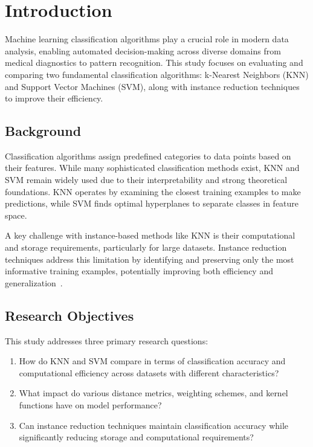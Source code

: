 \section{Introduction}
\label{sec:introduction}

Machine learning classification algorithms play a crucial role in modern data analysis, enabling automated decision-making across diverse domains from medical diagnostics to pattern recognition. This study focuses on evaluating and comparing two fundamental classification algorithms: k-Nearest Neighbors (KNN) and Support Vector Machines (SVM), along with instance reduction techniques to improve their efficiency.

\subsection{Background}

Classification algorithms assign predefined categories to data points based on their features. While many sophisticated classification methods exist, KNN and SVM remain widely used due to their interpretability and strong theoretical foundations. KNN operates by examining the closest training examples to make predictions, while SVM finds optimal hyperplanes to separate classes in feature space.

A key challenge with instance-based methods like KNN is their computational and storage requirements, 
particularly for large datasets. Instance reduction techniques address this limitation by identifying 
and preserving only the most informative training examples, potentially improving both efficiency 
and generalization~\cite{knn}.

\subsection{Research Objectives}

This study addresses three primary research questions:

\begin{enumerate}
    \item How do KNN and SVM compare in terms of classification accuracy and computational efficiency across datasets with different characteristics?
    \item What impact do various distance metrics, weighting schemes, and kernel functions have on model performance?
    \item Can instance reduction techniques maintain classification accuracy while significantly reducing storage and computational requirements?
\end{enumerate}

